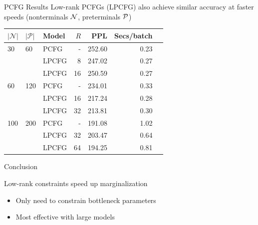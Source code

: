\documentclass{beamer}
\newlength{\onecolwid}
\begin{document}
\begin{frame}
\begin{columns}[t]
\begin{column}{\onecolwid}
\begin{block}{PCFG Results}
Low-rank PCFGs (LPCFG) also achieve similar accuracy at faster speeds
(nonterminals $\mathcal{N}$, preterminals $\mathcal{P}$)
\begin{table}
\centering
\begin{tabular} {lllrrrr}
\toprule
$|\mathcal{N}|$ & $|\mathcal{P}|$ & Model & $R$ &  PPL & Secs/batch\\ %
\midrule
30  & 60    & PCFG & - & 252.60 &  0.23\\  %
    &       & LPCFG & 8 &  247.02    & 0.27\\ %
    &       & LPCFG & 16 & 250.59    & 0.27\\ %
\midrule
60  & 120   & PCFG & - & 234.01 &  0.33\\ %
    &       & LPCFG & 16& 217.24 & 0.28\\ %
    &       & LPCFG & 32& 213.81 & 0.30\\ %
\midrule
100 & 200   & PCFG & - &  191.08   & 1.02\\ %
    &       & LPCFG & 32& 203.47 & 0.64\\ %
    &       & LPCFG & 64& 194.25 & 0.81\\ %
\bottomrule
\end{tabular}
\end{table}
\end{block}


\begin{block}{Conclusion}

Low-rank constraints speed up marginalization
\begin{itemize}
\item Only need to constrain bottleneck parameters
\item Most effective with large models
\end{itemize}


\end{block}
\end{column}
\end{columns}
\end{frame}
\end{document}
